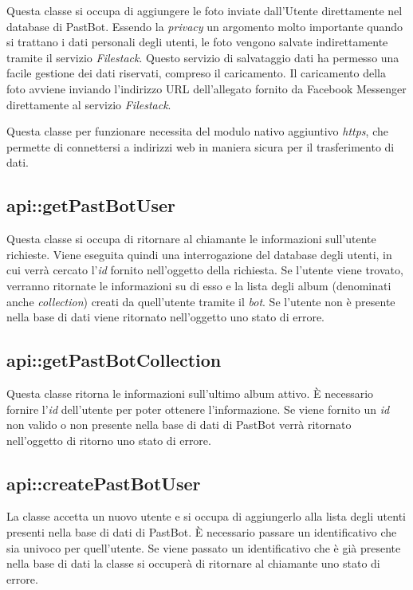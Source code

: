 Questa classe si occupa di aggiungere le foto inviate dall'Utente direttamente
nel database di PastBot. Essendo la \textit{privacy} un argomento molto
importante quando si trattano i dati personali degli utenti, le foto vengono
salvate indirettamente tramite il servizio \textit{Filestack}. Questo
servizio di salvataggio dati ha permesso una facile gestione dei dati
riservati, compreso il caricamento. Il caricamento della foto avviene inviando
l'indirizzo URL dell'allegato fornito da Facebook Messenger direttamente al
servizio \textit{Filestack}.


Questa classe per funzionare necessita del modulo nativo aggiuntivo
\textit{https}, che permette di connettersi a indirizzi web in maniera sicura
per il trasferimento di dati.

\subsection{api::getPastBotUser}

Questa classe si occupa di ritornare al chiamante le informazioni sull'utente
richieste. Viene eseguita quindi una interrogazione del database degli utenti,
in cui verrà cercato l'\textit{id} fornito nell'oggetto della richiesta. Se
l'utente viene trovato, verranno ritornate le informazioni su di esso e la
lista degli album (denominati anche \textit{collection}) creati da quell'utente
tramite il \textit{bot}.
Se l'utente non è presente nella base di dati viene ritornato nell'oggetto uno
stato di errore.

\subsection{api::getPastBotCollection}

Questa classe ritorna le informazioni sull'ultimo album attivo. È necessario
fornire l'\textit{id} dell'utente per poter ottenere l'informazione.
Se viene fornito un \textit{id} non valido o non presente nella base di dati di
PastBot verrà ritornato nell'oggetto di ritorno uno stato di errore.

\subsection{api::createPastBotUser}

La classe accetta un nuovo utente e si occupa di aggiungerlo alla lista
degli utenti presenti nella base di dati di PastBot. È necessario passare un
identificativo che sia univoco per quell'utente. Se viene passato un
identificativo che è già presente nella base di dati la classe si occuperà di
ritornare al chiamante uno stato di errore.

